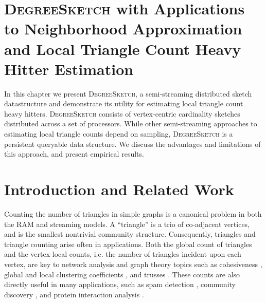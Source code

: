 \documentclass[10]{article}
\newcommand{\algoname}[1]{\textnormal{\textsc{#1}}}
\begin{document}
\section{\algoname{DegreeSketch} with Applications to Neighborhood Approximation and Local Triangle Count Heavy Hitter Estimation}
 \label{chap:DS}


In this chapter we present \algoname{DegreeSketch}, a semi-streaming distributed sketch datastructure and demonstrate its utility for estimating local triangle count heavy hitters.
\algoname{DegreeSketch} consists of vertex-centric cardinality sketches distributed across a set of processors. 
While other semi-streaming approaches to estimating local triangle counts depend on sampling, \algoname{DegreeSketch} is a persistent queryable data structure.
We discuss the advantages and limitations of this approach, and present empirical results.

\section{Introduction and Related Work}
 \label{DS:sec:intro}

Counting the number of triangles in simple graphs is a canonical problem in both the RAM and streaming models.
A ``triangle'' is a trio of co-adjacent vertices, and is the smallest nontrivial community structure.
Consequently, triangles and triangle counting arise often in applications.
Both the global count of triangles and the vertex-local counts, i.e. the number of triangles incident upon each vertex, are key to network analysis and graph theory topics such as cohesiveness \cite{lim2015mascot}, global and local clustering coefficients \cite{tsourakakis2008fast}, and trusses \cite{cohen2008trusses}.
These counts are also directly useful in many applications, such as spam detection \cite{becchetti2010efficient},  community discovery \cite{wang2010triangulation, berry2011tolerating}, and protein interaction analysis \cite{milo2002network}.
\end{document}
